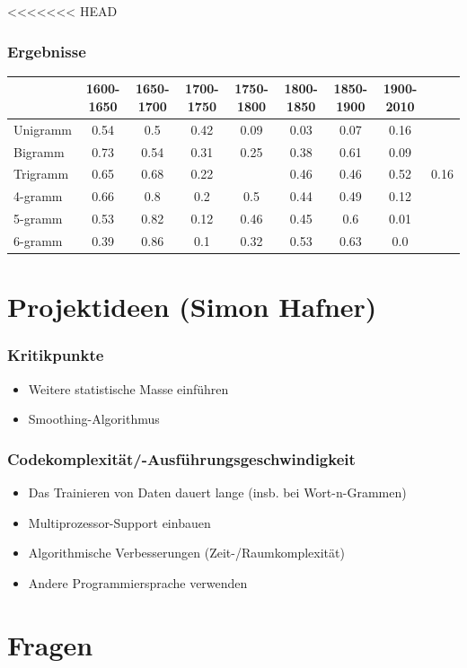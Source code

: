 \documentclass[t]{beamer} %
\begin{document}
\begin{frame}
<<<<<<< HEAD
  \frametitle{Ergebnisse}
  \tiny\begin{tabular}{l|ccccccc}
    & 1600-1650 & 1650-1700 & 1700-1750 & 1750-1800 & 1800-1850 & 1850-1900 &
    1900-2010 \\
    \hline
    Unigramm & 0.54 & 0.5 & 0.42 & 0.09 & 0.03 & 0.07 & 0.16 \\
    Bigramm & 0.73 & 0.54 & 0.31 & 0.25 & 0.38 & 0.61 & 0.09 \\
    Trigramm & 0.65 & 0.68 & 0.22 & & 0.46 & 0.46 & 0.52 & 0.16 \\
    4-gramm & 0.66 & 0.8 & 0.2 & 0.5 & 0.44 & 0.49 & 0.12 \\
    5-gramm & 0.53 & 0.82 & 0.12 & 0.46 & 0.45 & 0.6 & 0.01 \\
    6-gramm & 0.39 & 0.86 & 0.1 & 0.32 & 0.53 & 0.63 & 0.0 \\
  \end{tabular}
\end{frame}

\section{Projektideen (Simon Hafner)}

\begin{frame}
  \frametitle{Kritikpunkte}
  \begin{itemize}
  \item Weitere statistische Masse einführen\pause
  \item Smoothing-Algorithmus\pause
  \end{itemize}  
\end{frame}

\begin{frame}
  \frametitle{Codekomplexität/-Ausführungsgeschwindigkeit}
  \begin{itemize}
  \item Das Trainieren von Daten dauert lange (insb. bei Wort-n-Grammen)\pause
  \vspace*{1ex}
  \item Multiprozessor-Support einbauen\pause
  \item Algorithmische Verbesserungen (Zeit-/Raumkomplexität)\pause
  \item Andere Programmiersprache verwenden\pause
  \vspace*{1ex}
  \end{itemize}  
\end{frame}

\section{Fragen}
\end{document}
